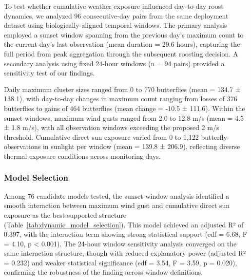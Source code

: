 To test whether cumulative weather exposure influenced day-to-day roost dynamics, we analyzed 96 consecutive-day pairs from the same deployment dataset using biologically-aligned temporal windows. The primary analysis employed a sunset window spanning from the previous day's maximum count to the current day's last observation (mean duration = 29.6 hours), capturing the full period from peak aggregation through the subsequent roosting decision. A secondary analysis using fixed 24-hour windows (n = 94 pairs) provided a sensitivity test of our findings.

Daily maximum cluster sizes ranged from 0 to 770 butterflies (mean = 134.7 ± 138.1), with day-to-day changes in maximum count ranging from losses of 376 butterflies to gains of 464 butterflies (mean change = -10.5 ± 111.6). Within the sunset windows, maximum wind gusts ranged from 2.0 to 12.8 m/s (mean = 4.5 ± 1.8 m/s), with all observation windows exceeding the proposed 2 m/s threshold. Cumulative direct sun exposure varied from 0 to 1,122 butterfly-observations in sunlight per window (mean = 139.8 ± 206.9), reflecting diverse thermal exposure conditions across monitoring days.

\subsubsection{Model Selection}

Among 76 candidate models tested, the sunset window analysis identified a smooth interaction between maximum wind gust and cumulative direct sun exposure as the best-supported structure (Table~\ref{tab:dynamic_model_selection}). This model achieved an adjusted R² of 0.397, with the interaction term showing strong statistical support (edf = 6.68, F = 4.10, p < 0.001). The 24-hour window sensitivity analysis converged on the same interaction structure, though with reduced explanatory power (adjusted R² = 0.232) and weaker statistical significance (edf = 3.54, F = 3.59, p = 0.020), confirming the robustness of the finding across window definitions.

